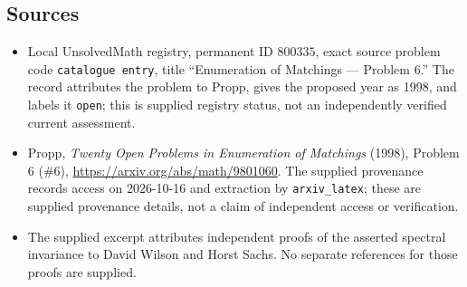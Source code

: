 \documentclass[11pt]{article}
\begin{document}
\subsection{Sources}
\begin{itemize}
\item Local UnsolvedMath registry, permanent ID \(800335\), exact source problem code \texttt{catalogue entry}, title ``Enumeration of Matchings --- Problem 6.'' The record attributes the problem to Propp, gives the proposed year as 1998, and labels it \texttt{open}; this is supplied registry status, not an independently verified current assessment.
\item Propp, \emph{Twenty Open Problems in Enumeration of Matchings} (1998), Problem 6 (\#6), \url{https://arxiv.org/abs/math/9801060}. The supplied provenance records access on 2026-10-16 and extraction by \texttt{arxiv\_latex}; these are supplied provenance details, not a claim of independent access or verification.
\item The supplied excerpt attributes independent proofs of the asserted spectral invariance to David Wilson and Horst Sachs. No separate references for those proofs are supplied.
\end{itemize}
\end{document}

